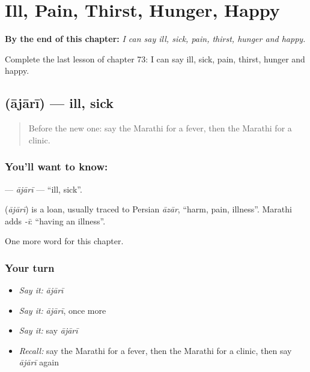 
\chapter{Ill, Pain, Thirst, Hunger, Happy}
\label{ch:mr-ill-pain-thirst-hunger-happy}

\begin{chapteropening}
\textbf{By the end of this chapter:} \emph{I can say ill, sick, pain, thirst, hunger and happy.}

Complete the last lesson of chapter 73: I can say ill, sick, pain, thirst, hunger and happy.
\end{chapteropening}

\section[\texorpdfstring{\mr{आजारी} (ājārī)}{आजारी (ājārī)}]{ (ājārī) — ill, sick}

\label{lesson:MR-C73-ajari}



\begin{quote}
Before the new one: say the Marathi for a fever, then the Marathi for a clinic.
\end{quote}

\subsection*{You'll want to know: }
\textbf{} — \emph{ājārī} — \textquotedblleft{}ill, sick\textquotedblright{}.

\begin{cousinweb}
\textbf{} (\emph{ājārī}) is a loan, usually traced to Persian \emph{āzār}, \textquotedblleft{}harm, pain, illness\textquotedblright{}. Marathi adds \emph{-ī}: \textquotedblleft{}having an illness\textquotedblright{}.
\end{cousinweb}

\begin{grammarlens}[title={What you've built}]
One more word for this chapter.
\end{grammarlens}

\subsection*{Your turn}
\begin{itemize}
\raggedright
  \item \emph{Say it:} \emph{ājārī}
  \item \emph{Say it:} \emph{ājārī}, once more
  \item \emph{Say it:} say \emph{ājārī}
  \item \emph{Recall:} say the Marathi for a fever, then the Marathi for a clinic, then say \emph{ājārī} again
\end{itemize}

